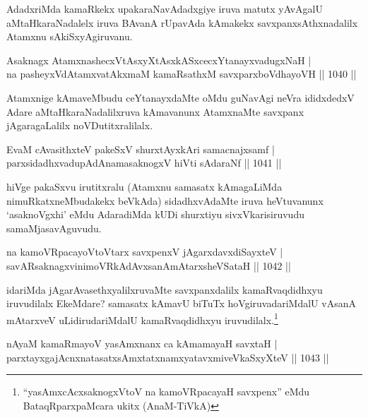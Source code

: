 \begin{artha}
AdadxriMda kamaRkekx upakaraNavAdadxgiye iruva matutx yAvAgalU aMtaHkaraNadalelx iruva BAvanA rUpavAda kAmakekx savxpanxsAthxnadalilx Atamxnu sAkiSxyAgiruvanu.
\end{artha}

\begin{shl}
Asaknagx AtamxnashecxVtAsxyXtAsxkASxcecxYtanayxvadugxNaH | \\
na pasheyxVdAtamxvatAkxmaM kamaRsathxM savxparxboVdhayoVH \hfill||  1040 ||  
\end{shl}

\begin{artha}
Atamxnige kAmaveMbudu ceYtanayxdaMte oMdu guNavAgi neVra ididxdedxV Adare aMtaHkaraNadalilxruva kAmavanunx AtamxnaMte savxpanx jAgaragaLalilx noVDutitxralilalx.
\end{artha}

\begin{shl}
EvaM cAvasithxteV pakeSxV shurxtAyx\s kAri samacnajxsamf | \\
parxsidadhxvadupAdAnamasaknogxV hiVti sAdaraNf \hfill||  1041 ||  
\end{shl}

\begin{artha}
hiVge pakaSxvu irutitxralu (Atamxnu samasatx kAmagaLiMda nimuRkatxneMbudakekx beVkAda) sidadhxvAdaMte iruva heVtuvanunx `asaknoVgxhi' eMdu AdaradiMda kUDi shurxtiyu sivxVkarisiruvudu samaMjasavAguvudu.
\end{artha}

\begin{shl}
na kamoVRpacayoV\s toV\s tarx savxpenxV jAgarxdavxdiSayxteV | \\
savARsaknagxvinimoVRkAdAvxsanAmAtarxsheVSataH \hfill||  1042 ||  
\end{shl}

\begin{artha}
idariMda jAgarAvasethxyalilxruvaMte savxpanxdalilx kamaRvaqdidhxyu iruvudilalx EkeMdare? samasatx kAmavU biTuTx hoVgiruvadariMdalU vAsanA mAtarxveV uLidirudariMdalU kamaRvaqdidhxyu iruvudilalx.\footnote[1]{``yasAmxcAcxsaknogxV\s toV na kamoVRpacayaH savxpenx'' eMdu BataqRparxpaMcara ukitx (AnaM-TiVkA)}
\end{artha}


\begin{shl}
nAyaM kamaRmayoV yasAmxnanx ca kAmamayaH savxtaH | \\
parxtayxgajAcnxnatasatxsAmxtatxnamxyatavxmiveVkaSxyXteV \hfill||  1043 ||  
\end{shl}

